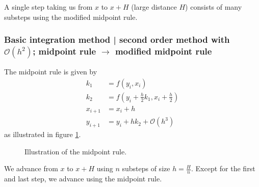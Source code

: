 A single step taking us from $x$ to $x+H$ (large distance $H$) consists of many substeps using the modified midpoint rule.

\subsubsection{Basic integration method | second order method with $\mathcal{O}(h^2)$; midpoint rule $\rightarrow$ modified midpoint rule}
The midpoint rule is given by
\begin{equation}
  \begin{aligned}
    k_1 &= f(y_i,x_i) \\
    k_2 &= f\left( y_i + \frac{h}{2} k_1, x_i + \frac{h}{2} \right) \\
    x_{i+1} &= x_i + h \\
    y_{i+1} &= y_i + h k_2 + \mathcal{O}(h^3)
  \end{aligned}
\end{equation}
as illustrated in figure \ref{fig:midpoint_rule}.

\begin{figure}[!htb]
  \centering
  \hfill
  \caption{Illustration of the midpoint rule.}
  \label{fig:midpoint_rule}
\end{figure}

We advance from $x$ to $x + H$ using $n$ substeps of size $h = \frac{H}{n}$. Except for the first and
last step, we advance using the midpoint rule.

